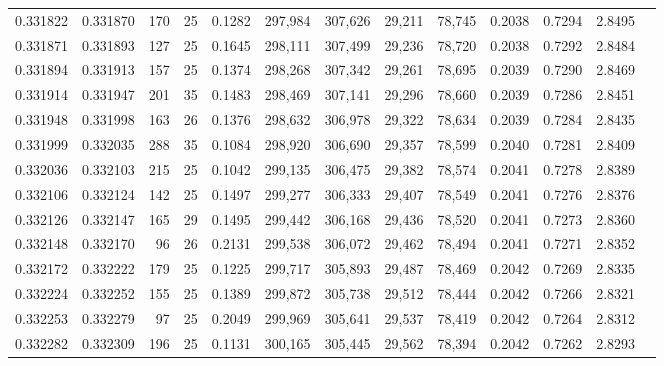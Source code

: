 \begin{tabular}{rrrrrrrrrrrrr}
0.331822 & 0.331870 &   170 &  25 &                                     0.1282 & 297,984 & 307,626 &  29,211 &  78,745 & 0.2038 & 0.7294 & 2.8495 \\
0.331871 & 0.331893 &   127 &  25 &                                     0.1645 & 298,111 & 307,499 &  29,236 &  78,720 & 0.2038 & 0.7292 & 2.8484 \\
0.331894 & 0.331913 &   157 &  25 &                                     0.1374 & 298,268 & 307,342 &  29,261 &  78,695 & 0.2039 & 0.7290 & 2.8469 \\
0.331914 & 0.331947 &   201 &  35 &                                     0.1483 & 298,469 & 307,141 &  29,296 &  78,660 & 0.2039 & 0.7286 & 2.8451 \\
0.331948 & 0.331998 &   163 &  26 &                                     0.1376 & 298,632 & 306,978 &  29,322 &  78,634 & 0.2039 & 0.7284 & 2.8435 \\
0.331999 & 0.332035 &   288 &  35 &                                     0.1084 & 298,920 & 306,690 &  29,357 &  78,599 & 0.2040 & 0.7281 & 2.8409 \\
0.332036 & 0.332103 &   215 &  25 &                                     0.1042 & 299,135 & 306,475 &  29,382 &  78,574 & 0.2041 & 0.7278 & 2.8389 \\
0.332106 & 0.332124 &   142 &  25 &                                     0.1497 & 299,277 & 306,333 &  29,407 &  78,549 & 0.2041 & 0.7276 & 2.8376 \\
0.332126 & 0.332147 &   165 &  29 &                                     0.1495 & 299,442 & 306,168 &  29,436 &  78,520 & 0.2041 & 0.7273 & 2.8360 \\
0.332148 & 0.332170 &    96 &  26 &                                     0.2131 & 299,538 & 306,072 &  29,462 &  78,494 & 0.2041 & 0.7271 & 2.8352 \\
0.332172 & 0.332222 &   179 &  25 &                                     0.1225 & 299,717 & 305,893 &  29,487 &  78,469 & 0.2042 & 0.7269 & 2.8335 \\
0.332224 & 0.332252 &   155 &  25 &                                     0.1389 & 299,872 & 305,738 &  29,512 &  78,444 & 0.2042 & 0.7266 & 2.8321 \\
0.332253 & 0.332279 &    97 &  25 &                                     0.2049 & 299,969 & 305,641 &  29,537 &  78,419 & 0.2042 & 0.7264 & 2.8312 \\
0.332282 & 0.332309 &   196 &  25 &                                     0.1131 & 300,165 & 305,445 &  29,562 &  78,394 & 0.2042 & 0.7262 & 2.8293 \\

\end{tabular}
